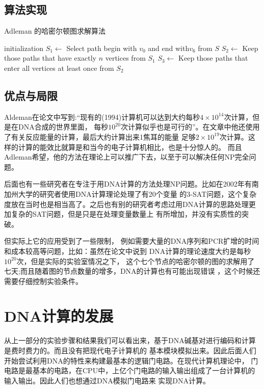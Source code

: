 \documentclass[a4paper,twoside]{article}
\begin{document}
\subsection{算法实现}
\begin{algorithm}[ht]
	\SetAlgoLined
	\caption{Adleman 的哈密尔顿图求解算法}\label{algorithm}
	initialization\;
	$S_1  \leftarrow$ Select path begin with $v_0$ and end with$v_6$ from $S$ \;
	$S_2  \leftarrow$ Keep those paths that have exactly $n$ vertices from $S_1$ \;
	$S_3  \leftarrow$ Keep those paths that enter all vertices at least once from $S_2$ \;
\end{algorithm}

\subsection{优点与局限}
Aldeman在论文中写到:“现有的(1994)计算机可以达到大约每秒$4 \times 10^{14}$次计算，但是在DNA合成的世界里面，
每秒$10^{20}$次计算似乎也是可行的”。在文章中他还使用了有关反应能量的计算，最后大约计算出来1焦耳的能量
足够$2 \times 10^{19}$次计算。这样的计算的能效比就算是和当今的电子计算机相比，也是十分惊人的。
而且Adleman希望，他的方法在理论上可以推广下去，以至于可以解决任何NP完全问题。

后面也有一些研究者在专注于用DNA计算的方法处理NP问题。比如在2002年有南加州大学的研究者\cite{20v}使用DNA计算理论处理了有20个变量
的3-SAT问题，这个复杂度放在当时也是相当高了。之后也有别的研究者考虑过用DNA计算的思路处理更加复杂的SAT问题，但是只是在处理变量数量上
有所增加，并没有实质性的突破。

但实际上它的应用受到了一些限制，
例如需要大量的DNA序列和PCR扩增的时间和成本较高等问题，比如：虽然在论文中说到
DNA计算的理论速度大约是每秒$10^{20}$次，但是实际的实验室情况之下，
这个七个节点的哈密尔顿的图的求解用了七天;而且随着图的节点数量的增多，DNA的计算也有可能出现错误
，这个时候还需要仔细控制实验条件。



\newpage
\section{DNA计算的发展}
从上一部分的实验步骤和结果我们可以看出来，基于DNA碱基对进行编码和计算是费时费力的。而且没有把现代电子计算机的
基本模块模拟出来。因此后面人们开始尝试利用DNA的特性来构建最基本的逻辑门电路。在现代计算机理论中，
门电路是最基本的电路，在CPU中，上亿个门电路的输入输出组成了一台计算机的输入输出。因此人们也想通过DNA模拟门电路来
实现DNA计算。
\end{document}
